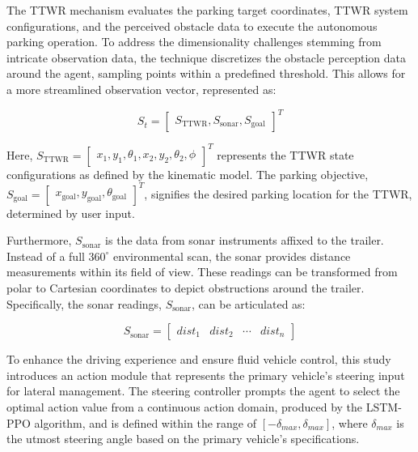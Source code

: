 The TTWR mechanism evaluates the parking target coordinates, TTWR system configurations, and the perceived obstacle data to execute the autonomous parking operation. To address the dimensionality challenges stemming from intricate observation data, the technique discretizes the obstacle perception data around the agent, sampling points within a predefined threshold. This allows for a more streamlined observation vector, represented as:

\begin{equation}
S_t = \left[\begin{array}{ccc}
S_\text{TTWR}, S_\text{sonar}, S_\text{goal}
\end{array}\right]^T
\label{eq: observation}
\end{equation}

Here, $S_\text{TTWR} = \left[\begin{array}{ccc} x_1, y_1, \theta_1, x_2, y_2, \theta_2, \phi\end{array}\right]^T$ represents the TTWR state configurations as defined by the kinematic model. The parking objective, $S_\text{goal} = \left[\begin{array}{ccc} x_\text{goal}, y_\text{goal}, \theta_\text{goal}\end{array}\right]^T$, signifies the desired parking location for the TTWR, determined by user input.

Furthermore, $S_\text{sonar}$ is the data from sonar instruments affixed to the trailer. Instead of a full $360^{\circ}$ environmental scan, the sonar provides distance measurements within its field of view. These readings can be transformed from polar to Cartesian coordinates to depict obstructions around the trailer. Specifically, the sonar readings, $S_\text{sonar}$, can be articulated as:

\begin{equation}
S_\text{sonar}=\left[\begin{array}{cccc}
dist_{1} & dist_{2} & \cdots & dist_{n}
\end{array}\right]
\label{eq: sonar observation}
\end{equation}

To enhance the driving experience and ensure fluid vehicle control, this study introduces an action module that represents the primary vehicle's steering input for lateral management. The steering controller prompts the agent to select the optimal action value from a continuous action domain, produced by the LSTM-PPO algorithm, and is defined within the range of $[-\delta_{max}, \delta_{max}]$, where $\delta_{max}$ is the utmost steering angle based on the primary vehicle's specifications.

